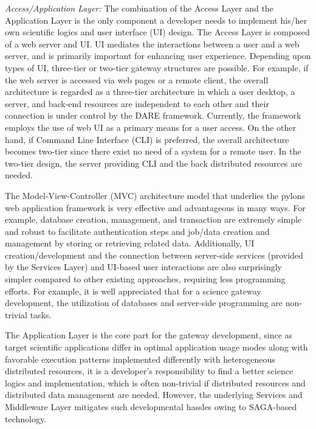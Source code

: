\documentclass{sig-alternate}
\begin{document}
\textit{Access/Application Layer:} The combination of the Access Layer
and the Application Layer is the only component a developer needs to
implement his/her own scientific logics and user interface (UI)
design.  The Access Layer is composed of a web server and UI.  UI
mediates the interactions between a user and a web server, and is
primarily important for enhancing user experience.  Depending upon
types of UI, three-tier or two-tier gateway structures are possible.
For example, if the web server is accessed via web pages or a remote
client, the overall architecture is regarded as a three-tier
architecture in which a user desktop, a server, and back-end resources
are independent to each other and their connection is under control by
the DARE framework.  Currently, the framework employs the use of web
UI as a primary means for a user access.  On the other hand, if
Command Line Interface (CLI) is preferred, the overall architecture
becomes two-tier since there exist no need of a system for a remote
user.  In the two-tier design, the server providing CLI and the back distributed resources are needed.

The Model-View-Controller (MVC) architecture model that underlies the
pylons web application framework\cite{pylonsurl} is very effective and advantageous in
many ways. For example, database creation, management, and transaction
are extremely simple and robust to facilitate authentication steps and
job/data creation and management by storing or retrieving related
data.  Additionally, UI creation/development and the connection
between server-side services (provided by the Services Layer) and
UI-based user interactions are also surprisingly simpler compared to
other existing approaches, requiring less programming efforts.  For
example, it is well appreciated that for a science gateway
development, the utilization of databases and server-side programming
are non-trivial tasks.

The Application Layer is the core part for the gateway development,
since as target scientific applications differ in optimal application
usage modes along with favorable execution patterns implemented
differently with heterogeneous distributed resources, it is a
developer's responsibility to find a better science logics and
implementation, which is often non-trivial if distributed resources
and distributed data management are needed.  However, the underlying
Services and Middleware Layer mitigates such developmental hassles
owing to SAGA-based technology.
\end{document}
